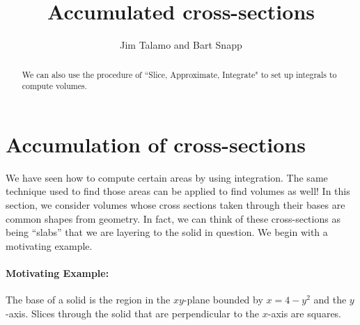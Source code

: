\documentclass{ximera}
\author{Jim Talamo and Bart Snapp}
\title[Dig-In:]{Accumulated cross-sections}
\begin{document}
\begin{abstract}
  We can also use the procedure of ``Slice, Approximate, Integrate" to set up integrals to compute volumes.
\end{abstract}
\maketitle

\section{Accumulation of cross-sections}

We have seen how to compute certain areas by using integration. The same technique used to find those areas can be applied to find volumes as well! In this section, we consider volumes whose cross sections taken through their bases are common shapes from geometry.  In fact, we can think of these cross-sections as being ``slabs'' that we are layering to the solid in question.  We begin with a motivating example.



\paragraph{Motivating Example:} The base of a solid is the region in the $xy$-plane bounded by $x=4-y^2$ and the $y$-axis.  Slices through the solid that are perpendicular to the $x$-axis are squares.  
\end{document}
